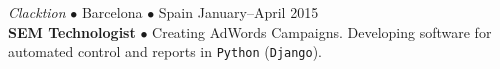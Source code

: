\documentclass[a4paper, oneside]{scrreprt}
\begin{document}
\vspace{-0.3cm}
\noindent{}\textit{Clacktion} $\bullet$ 
Barcelona $\bullet$ Spain \hfill January--April 2015\\
\noindent\textbf{\small SEM Technologist} $\bullet$ Creating AdWords Campaigns.
Developing software for automated control and reports in \texttt{Python} (\texttt{Django}).\\ 

\vspace{-0.3cm}
\noindent\makebox[\linewidth]{\rule{\textwidth}{0.4pt}}
\end{document}
